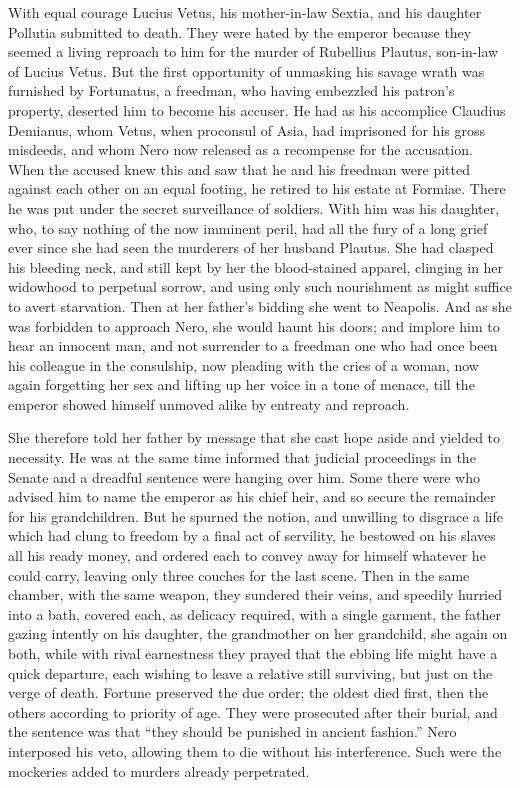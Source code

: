 
With equal courage Lucius Vetus, his mother-in-law Sextia, and his daughter Pollutia submitted to death. They were hated by the emperor because they seemed a living reproach to him for the murder of Rubellius Plautus, son-in-law of Lucius Vetus. But the first opportunity of unmasking his savage wrath was furnished by Fortunatus, a freedman, who having embezzled his patron's property, deserted him to become his accuser. He had as his accomplice Claudius Demianus, whom Vetus, when proconsul of Asia, had imprisoned for his gross misdeeds, and whom Nero now released as a recompense for the accusation. When the accused knew this and saw that he and his freedman were pitted against each other on an equal footing, he retired to his estate at Formiae. There he was put under the secret surveillance of soldiers. With him was his daughter, who, to say nothing of the now imminent peril, had all the fury of a long grief ever since she had seen the murderers of her husband Plautus. She had clasped his bleeding neck, and still kept by her the blood-stained apparel, clinging in her widowhood to perpetual sorrow, and using only such nourishment as might suffice to avert starvation. Then at her father's bidding she went to Neapolis. And as she was forbidden to approach Nero, she would haunt his doors; and implore him to hear an innocent man, and not surrender to a freedman one who had once been his colleague in the consulship, now pleading with the cries of a woman, now again forgetting her sex and lifting up her voice in a tone of menace, till the emperor showed himself unmoved alike by entreaty and reproach.


She therefore told her father by message that she cast hope aside and yielded to necessity. He was at the same time informed that judicial proceedings in the Senate and a dreadful sentence were hanging over him. Some there were who advised him to name the emperor as his chief heir, and so secure the remainder for his grandchildren. But he spurned the notion, and unwilling to disgrace a life which had clung to freedom by a final act of servility, he bestowed on his slaves all his ready money, and ordered each to convey away for himself whatever he could carry, leaving only three couches for the last scene. Then in the same chamber, with the same weapon, they sundered their veins, and speedily hurried into a bath, covered each, as delicacy required, with a single garment, the father gazing intently on his daughter, the grandmother on her grandchild, she again on both, while with rival earnestness they prayed that the ebbing life might have a quick departure, each wishing to leave a relative still surviving, but just on the verge of death. Fortune preserved the due order; the oldest died first, then the others according to priority of age. They were prosecuted after their burial, and the sentence was that ``they should be punished in ancient fashion.'' Nero interposed his veto, allowing them to die without his interference. Such were the mockeries added to murders already perpetrated.

